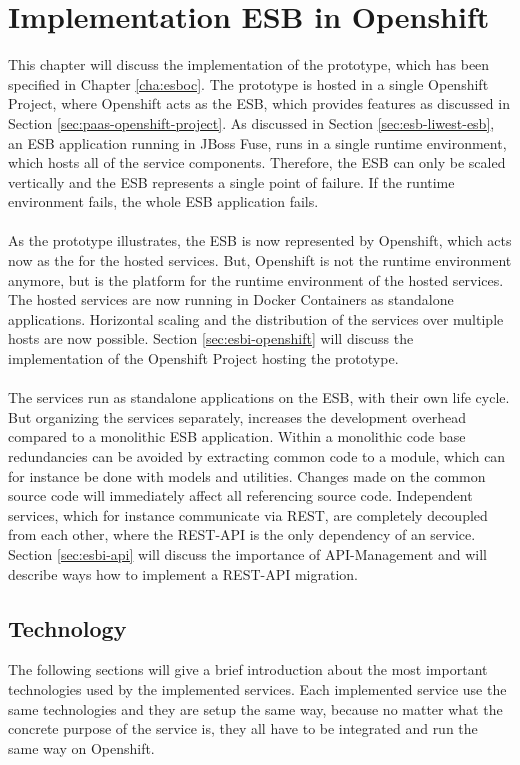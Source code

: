 \chapter{Implementation ESB in Openshift}
\label{cha:esbi}
This chapter will discuss the implementation of the prototype, which has been specified in Chapter \vref{cha:esboc}. The prototype is hosted in a single Openshift Project, where Openshift acts as the ESB, which provides features as discussed in Section \vref{sec:paas-openshift-project}. As discussed in Section \vref{sec:esb-liwest-esb}, an ESB application running in JBoss Fuse, runs in a single runtime environment, which hosts all of the service components. Therefore, the ESB can only be scaled vertically and the ESB represents a single point of failure. If the runtime environment fails, the whole ESB application fails.
\\ \\
As the prototype illustrates, the ESB is now represented by Openshift, which acts now as the  for the hosted services. But, Openshift is not the runtime environment anymore, but is the platform for the runtime environment of the hosted services. The hosted services are now running in Docker Containers as standalone applications. Horizontal scaling and the distribution of the services over multiple hosts are now possible. Section \vref{sec:esbi-openshift} will discuss the implementation of the Openshift Project hosting the prototype.
\\ \\
The services run as standalone applications on the ESB, with their own life cycle. But organizing the services separately, increases the development overhead compared to a monolithic ESB application. Within a monolithic code base redundancies can be avoided by extracting common code to a module, which can for instance be done with models and utilities. Changes made on the common source code will immediately affect all referencing source code. Independent services, which for instance communicate via REST, are completely decoupled from each other, where the REST-API is the only dependency of an service. Section \vref{sec:esbi-api} will discuss the importance of API-Management and will describe ways how to implement a REST-API migration.

\section{Technology}
\label{sec:esbi-technolody-fis}
The following sections will give a brief introduction about the most important technologies used by the implemented services. Each implemented service use the same technologies and they are setup the same way, because no matter what the concrete purpose of the service is, they all have to be integrated and run the same way on Openshift.

